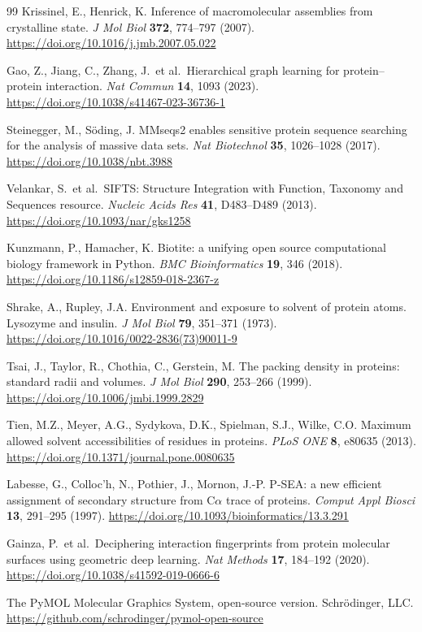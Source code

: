 \documentclass[10pt]{article}
\begin{document}
\begin{thebibliography}{99}
 Krissinel, E., Henrick, K. Inference of macromolecular
assemblies from crystalline state. \emph{J Mol Biol} \textbf{372}, 774--797
(2007). \url{https://doi.org/10.1016/j.jmb.2007.05.022}

 Gao, Z., Jiang, C., Zhang, J.\ et al.\ Hierarchical graph
learning for protein--protein interaction. \emph{Nat Commun} \textbf{14}, 1093
(2023). \url{https://doi.org/10.1038/s41467-023-36736-1}

 Steinegger, M., S\"oding, J. MMseqs2 enables
sensitive protein sequence searching for the analysis of massive data sets.
\emph{Nat Biotechnol} \textbf{35}, 1026--1028 (2017).
\url{https://doi.org/10.1038/nbt.3988}

 Velankar, S.\ et al.\ SIFTS: Structure Integration
with Function, Taxonomy and Sequences resource. \emph{Nucleic Acids Res}
\textbf{41}, D483--D489 (2013). \url{https://doi.org/10.1093/nar/gks1258}

 Kunzmann, P., Hamacher, K. Biotite: a unifying open
source computational biology framework in Python. \emph{BMC Bioinformatics}
\textbf{19}, 346 (2018). \url{https://doi.org/10.1186/s12859-018-2367-z}

 Shrake, A., Rupley, J.A. Environment and exposure to
solvent of protein atoms. Lysozyme and insulin. \emph{J Mol Biol}
\textbf{79}, 351--371 (1973).
\url{https://doi.org/10.1016/0022-2836(73)90011-9}

 Tsai, J., Taylor, R., Chothia, C., Gerstein, M. The
packing density in proteins: standard radii and volumes. \emph{J Mol Biol}
\textbf{290}, 253--266 (1999). \url{https://doi.org/10.1006/jmbi.1999.2829}

 Tien, M.Z., Meyer, A.G., Sydykova, D.K., Spielman, S.J.,
Wilke, C.O. Maximum allowed solvent accessibilities of residues in proteins.
\emph{PLoS ONE} \textbf{8}, e80635 (2013).
\url{https://doi.org/10.1371/journal.pone.0080635}

 Labesse, G., Colloc'h, N., Pothier, J., Mornon, J.-P.
P-SEA: a new efficient assignment of secondary structure from C$\alpha$ trace
of proteins. \emph{Comput Appl Biosci} \textbf{13}, 291--295 (1997).
\url{https://doi.org/10.1093/bioinformatics/13.3.291}

 Gainza, P.\ et al.\ Deciphering interaction fingerprints
from protein molecular surfaces using geometric deep learning. \emph{Nat
Methods} \textbf{17}, 184--192 (2020).
\url{https://doi.org/10.1038/s41592-019-0666-6}

 The PyMOL Molecular Graphics System, open-source version.
Schr\"odinger, LLC. \url{https://github.com/schrodinger/pymol-open-source}

\end{thebibliography}
\end{document}
